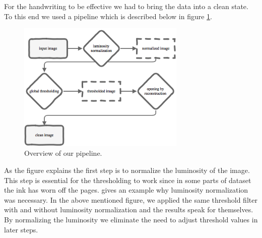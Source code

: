 For the handwriting to be effective we had to bring the data into a clean state. To this end we used a pipeline which is described below in figure \ref{fig:pipeline}. 

\begin{figure}[ht]
\includegraphics[width=8cm]{shared/img/pipeline.png}
\caption{Overview of our pipeline.}
\label{fig:pipeline}
\end{figure}

As the figure explains the first step is to normalize the luminosity of the image. This step is essential for the thresholding to work since in some parts of dataset the ink has worn off the pages.  gives an example why luminosity normalization was necessary. In the above mentioned figure, we applied the same threshold filter with and without luminosity normalization and the results speak for themselves. By normalizing the luminosity we eliminate the need to adjust threshold values in later steps.

